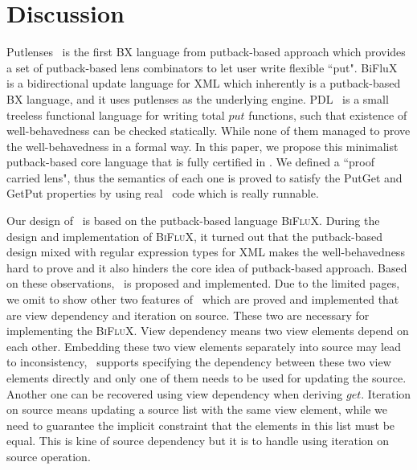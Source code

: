 \section{Discussion}
\label{sec:discussion}

Putlenses~\cite{Pacheco-putlenses} is the first BX language from putback-based approach
which provides a set of putback-based lens combinators to let user write flexible ``put".
BiFluX~\cite{Pacheco-BiFluX} is a bidirectional update language for XML
which inherently is a putback-based BX language,
and it uses putlenses as the underlying engine.
%
PDL~\cite{Hu-putback-validity} is a small treeless functional language for writing total $put$ functions,
such that existence of well-behavedness can be checked statically.
While none of them managed to prove the well-behavedness in a formal way.
In this paper, we propose this minimalist putback-based core language
that is fully certified in \Agda.
We defined a ``proof carried lens",
thus the semantics of each one is proved to satisfy the PutGet and GetPut properties by using real \Agda\ code
which is really runnable. %
%

Our design of \BiGUL\ is based on the putback-based language \textsc{BiFluX}.
%
During the design and implementation of \textsc{BiFluX},
it turned out that the putback-based design mixed with regular expression types for XML
makes the well-behavedness hard to prove
and it also hinders the core idea of putback-based approach.
Based on these observations, \BiGUL\ is proposed and implemented.
Due to the limited pages,
we omit to show other two features of \BiGUL\ which are proved and implemented
that are view dependency and iteration on source.
These two are necessary for implementing the \textsc{BiFluX}.
View dependency means two view elements depend on each other.
Embedding these two view elements separately into source may lead to inconsistency,
\BiGUL\ supports specifying the dependency between these two view elements directly
and only one of them needs to be used for updating the source.
Another one can be recovered using view dependency when deriving $get$.
%
Iteration on source means updating a source list with the same view element, while we need to guarantee the implicit constraint that
the elements in this list must be equal. This is kine of source dependency but it is to handle using iteration on source operation. %


